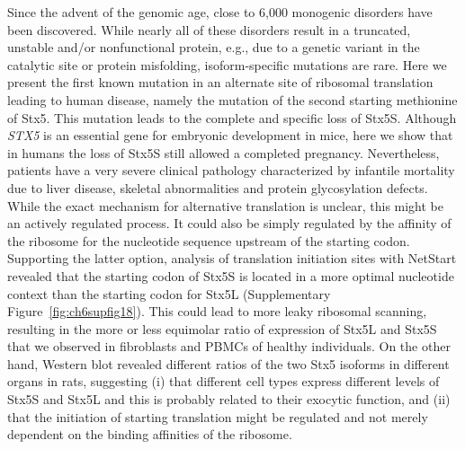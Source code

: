 Since the advent of the genomic age, close to 6,000 monogenic disorders have been discovered\cite{amberger_omim.org:_2015}. While nearly all of these disorders result in a truncated, unstable and/or nonfunctional protein, e.g., due to a genetic variant in the catalytic site or protein misfolding, isoform-specific mutations are rare. Here we present the first known mutation in an alternate site of ribosomal translation leading to human disease, namely the mutation of the second starting methionine of Stx5. This mutation leads to the complete and specific loss of Stx5S. Although \emph{STX5} is an essential gene for embryonic development in mice\cite{dickinson_high-throughput_2016,koscielny_international_2014}, here we show that in humans the loss of Stx5S still allowed a completed pregnancy. Nevertheless, patients have a very severe clinical pathology characterized by infantile mortality due to liver disease, skeletal abnormalities and protein glycosylation defects. While the exact mechanism for alternative translation is unclear, this might be an actively regulated process. It could also be simply regulated by the affinity of the ribosome for the nucleotide sequence upstream of the starting codon. Supporting the latter option, analysis of translation initiation sites with NetStart\cite{pedersen_neural_1997} revealed that the starting codon of Stx5S is located in a more optimal nucleotide context than the starting codon for Stx5L (Supplementary Figure~\ref{fig:ch6supfig18}). This could lead to more leaky ribosomal scanning\cite{kochetov_alternative_2008,kozak_regulation_2005}, resulting in the more or less equimolar ratio of expression of Stx5L and Stx5S that we observed in fibroblasts and PBMCs of healthy individuals. On the other hand, Western blot revealed different ratios of the two Stx5 isoforms in different organs in rats\cite{hui_isoform_1997}, suggesting (i) that different cell types express different levels of Stx5S and Stx5L and this is probably related to their exocytic function, and (ii) that the initiation of starting translation might be regulated and not merely dependent on the binding affinities of the ribosome. 

